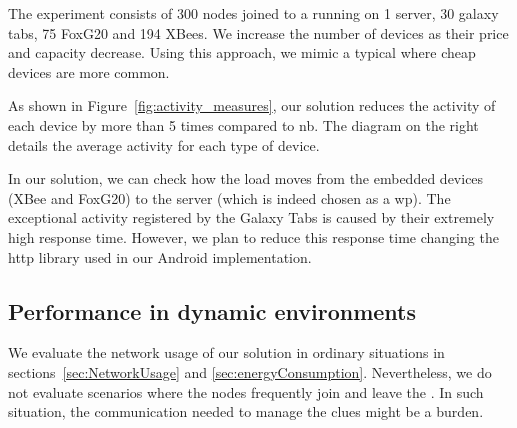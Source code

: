 The experiment consists of 300 nodes joined to a \Space{} running on 1 server, 30 galaxy tabs, 75 FoxG20 and 194 XBees.
We increase the number of devices as their price and capacity decrease.
Using this approach, we mimic a typical \Space{} where cheap devices are more common.

As shown in Figure~\ref{fig:activity_measures}, our solution reduces the activity of each device by more than 5 times compared to \acl{nb}.
The diagram on the right details the average activity for each type of device.

In our solution, we can check how the load moves from the embedded devices (XBee and FoxG20) to the server (which is indeed chosen as a \ac{wp}).
The exceptional activity registered by the Galaxy Tabs is caused by their extremely high response time.
However, we plan to reduce this response time changing the \acs{http} library used in our Android implementation.



%



\subsection{Performance in dynamic environments}
\label{sec:dynamic}
We evaluate the network usage of our solution in ordinary situations in sections~\ref{sec:NetworkUsage} and \ref{sec:energyConsumption}.
Nevertheless, we do not evaluate scenarios where the nodes frequently join and leave the \Space{}.
In such situation, the communication needed to manage the clues might be a burden.


